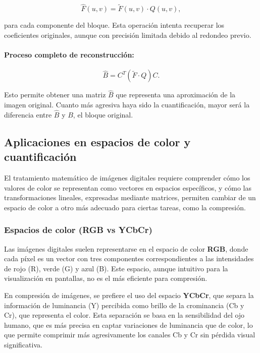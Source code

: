 \documentclass[8pt,a4paper]{article}
\theoremstyle{definition}
\theoremstyle{remark}
\begin{document}
\begin{multicols}{2}
            \[
            \hat{F}(u,v) = \tilde{F}(u,v) \cdot Q(u,v),
            \]
            
            para cada componente del bloque. Esta operación intenta recuperar los coeficientes originales, aunque con precisión limitada debido al redondeo previo.
            
            \paragraph{Proceso completo de reconstrucción:}
            
            \[
            \hat{B} = C^T (\tilde{F} \cdot Q) C.
            \]
            
            Esto permite obtener una matriz \(\hat{B}\) que representa una aproximación de la imagen original. Cuanto más agresiva haya sido la cuantificación, mayor será la diferencia entre \( \hat{B} \) y \( B \), el bloque original.
            
        

        \subsection{Aplicaciones en espacios de color y cuantificación}

            El tratamiento matemático de imágenes digitales requiere comprender cómo los valores de color se representan como vectores en espacios específicos, y cómo las transformaciones lineales, expresadas mediante matrices, permiten cambiar de un espacio de color a otro más adecuado para ciertas tareas, como la compresión.
            
            \subsubsection{Espacios de color (RGB vs YCbCr)}
            
            Las imágenes digitales suelen representarse en el espacio de color \textbf{RGB}, donde cada píxel es un vector con tres componentes correspondientes a las intensidades de rojo (R), verde (G) y azul (B). Este espacio, aunque intuitivo para la visualización en pantallas, no es el más eficiente para compresión.
            
            En compresión de imágenes, se prefiere el uso del espacio \textbf{YCbCr}, que separa la información de luminancia (Y) percibida como brillo de la crominancia (Cb y Cr), que representa el color. Esta separación se basa en la sensibilidad del ojo humano, que es más precisa en captar variaciones de luminancia que de color, lo que permite comprimir más agresivamente los canales Cb y Cr sin pérdida visual significativa.
            

\end{multicols}
\end{document}
